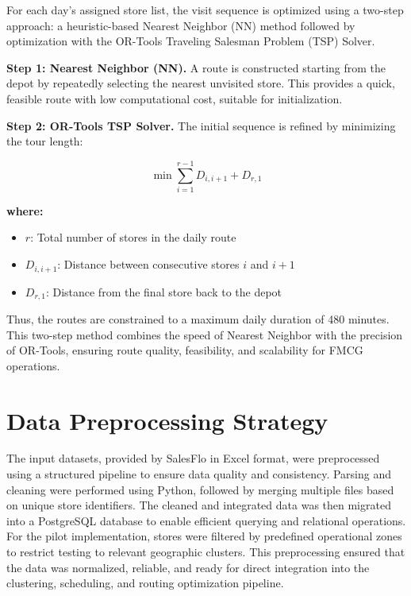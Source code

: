 For each day’s assigned store list, the visit sequence is optimized using a two-step approach: a heuristic-based Nearest Neighbor (NN) method followed by optimization with the OR-Tools Traveling Salesman Problem (TSP) Solver.

\textbf{Step 1: Nearest Neighbor (NN).} A route is constructed starting from the depot by repeatedly selecting the nearest unvisited store. This provides a quick, feasible route with low computational cost, suitable for initialization.

\textbf{Step 2: OR-Tools TSP Solver.} The initial sequence is refined by minimizing the tour length:

\[
\min \sum_{i=1}^{r-1} D_{i,i+1} + D_{r,1}
\]

\textbf{where:}
\begin{itemize}
  \item $r$: Total number of stores in the daily route
  \item $D_{i,i+1}$: Distance between consecutive stores $i$ and $i+1$
  \item $D_{r,1}$: Distance from the final store back to the depot
\end{itemize}

Thus, the routes are constrained to a maximum daily duration of 480 minutes. This two-step method combines the speed of Nearest Neighbor with the precision of OR-Tools, ensuring route quality, feasibility, and scalability for FMCG operations.
\section{Data Preprocessing Strategy}



The input datasets, provided by SalesFlo in Excel format, were preprocessed using a structured pipeline to ensure data quality and consistency. Parsing and cleaning were performed using Python, followed by merging multiple files based on unique store identifiers. The cleaned and integrated data was then migrated into a PostgreSQL database to enable efficient querying and relational operations. For the pilot implementation, stores were filtered by predefined operational zones to restrict testing to relevant geographic clusters. This preprocessing ensured that the data was normalized, reliable, and ready for direct integration into the clustering, scheduling, and routing optimization pipeline.
